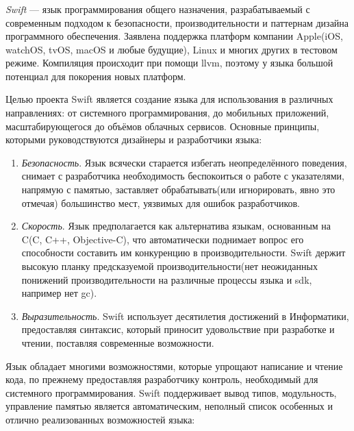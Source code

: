 \subsubsection{}
\label{sec:development:arch:ios:swift}

\emph{Swift} --- язык программирования общего назначения, разрабатываемый с современным подходом к безопасности, производительности и паттернам дизайна программного обеспечения.\cite{swift:about} Заявлена поддержка платформ компании Apple(iOS, watchOS, tvOS, macOS и любые будущие), Linux и многих других в тестовом режиме. Компиляция происходит при помощи \gls{llvm}, поэтому у языка большой потенциал для покорения новых платформ.

Целью проекта Swift является создание языка для использования в различных направлениях: от системного программирования, до мобильных приложений, масштабирующегося до объёмов облачных сервисов. Основные принципы, которыми руководствуются дизайнеры и разработчики языка:

\begin{enumerate}
	\item \emph{Безопасность}. Язык всячески старается избегать неопределённого поведения, снимает с разработчика необходимость беспокоиться о работе с указателями, напрямую с памятью, заставляет обрабатывать(или игнорировать, явно это отмечая) большинство мест, уязвимых для ошибок разработчиков.
	\item \emph{Скорость}. Язык предполагается как альтернатива языкам, основанным на C(C, C++, Objective-C), что автоматически поднимает вопрос его способности составить им конкуренцию в производительности. Swift держит высокую планку предсказуемой производительности(нет неожиданных понижений производительности на различные процессы языка и \gls{sdk}, например нет \gls{gc}).
	\item \emph{Выразительность}. Swift использует десятилетия достижений в Информатики, предоставляя синтаксис, который приносит удовольствие при разработке и чтении, поставляя современные возможности.  
\end{enumerate}

Язык обладает многими возможностями, которые упрощают написание и чтение кода, по прежнему предоставляя разработчику контроль, необходимый для системного программирования. Swift поддерживает вывод типов, модульность, управление памятью является автоматическим, неполный список особенных и отлично реализованных возможностей языка:

